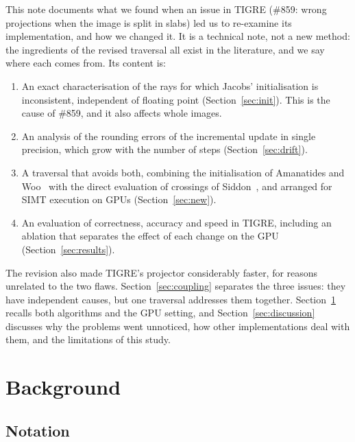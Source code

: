 \documentclass[11pt,a4paper]{article}
\theoremstyle{remark}
\begin{document}
This note documents what we found when an issue in TIGRE (\#859: wrong projections when the image is
split in slabs) led us to re-examine its implementation, and how we changed it. It is a technical note, not
a new method: the ingredients of the revised traversal all exist in the literature, and we say where each
comes from. Its content is:
\begin{enumerate}
\item An exact characterisation of the rays for which Jacobs' initialisation is inconsistent,
independent of floating point (Section~\ref{sec:init}). This is the cause of \#859, and it also
affects whole images.
\item An analysis of the rounding errors of the incremental update in single precision, which grow
with the number of steps (Section~\ref{sec:drift}).
\item A traversal that avoids both, combining the initialisation of Amanatides and
Woo~\cite{amanatides1987fast} with the direct evaluation of crossings of Siddon~\cite{siddon1985fast}, and
arranged for SIMT execution on GPUs (Section~\ref{sec:new}).
\item An evaluation of correctness, accuracy and speed in TIGRE, including an ablation that separates the
effect of each change on the GPU (Section~\ref{sec:results}).
\end{enumerate}
The revision also made TIGRE's projector considerably faster, for reasons unrelated to the two flaws.
Section~\ref{sec:coupling} separates the three issues: they have independent causes, but one traversal
addresses them together.
Section~\ref{sec:background} recalls both algorithms and the GPU setting, and
Section~\ref{sec:discussion} discusses why the problems went unnoticed, how other implementations deal with
them, and the limitations of this study.

\section{Background}
\label{sec:background}

\subsection{Notation}
\end{document}
